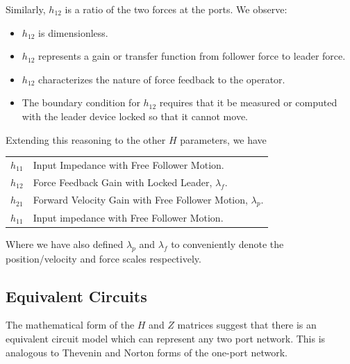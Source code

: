 Similarly, $h_{12}$ is a ratio of the two forces at the ports.   We observe:

\begin{itemize}
  \item $h_{12}$ is dimensionless.
  \item $h_{12}$ represents a gain or transfer function from follower force to leader force.
  \item $h_{12}$ characterizes the nature of force feedback to the operator.
  \item The boundary condition for $h_{12}$ requires that it be measured or computed with the leader device locked so that it cannot move.
\end{itemize}

Extending this reasoning to the other $H$ parameters, we have

\vspace{0.25in}
\begin{tabular}{ll}
\hline
$h_{11}$        &    Input Impedance with Free Follower Motion.   \\
$h_{12}$        &    Force Feedback Gain with Locked Leader, $\lambda_f$. \\
$h_{21}$        &    Forward Velocity Gain with Free Follower Motion,  $\lambda_p$.   \\
$h_{11}$        &    Input impedance with Free Follower Motion.   \\
\hline
\end{tabular}



\vspace{0.25in}
Where we have also defined $\lambda_p$ and $\lambda_f$ to conveniently denote the position/velocity and force scales respectively.	%


\subsection{Equivalent Circuits}

The mathematical form of the $H$ and $Z$ matrices suggest that there is an equivalent circuit model which can represent any two port network.   This is analogous to Thevenin and Norton forms of the one-port network.	%


